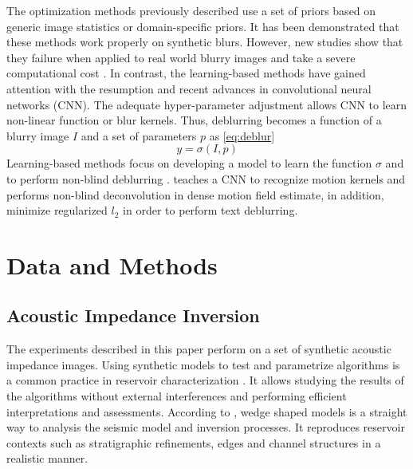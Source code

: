 \documentclass[conference]{IEEEtran}
\begin{document}
The optimization methods previously described use a set of priors based on
generic image statistics or domain-specific priors. It has been demonstrated
that these methods work properly on synthetic blurs. However, new studies show that they failure
when applied to real world blurry images \cite{Lai2016} and take a severe computational cost \cite{Chakrabarti2016}.
In contrast, the learning-based methods have gained attention with the resumption and recent advances in convolutional neural
networks (CNN). The adequate hyper-parameter adjustment allows CNN to learn
non-linear function or blur kernels. Thus, deblurring becomes a function of a blurry image $I$
and a set of parameters $p$ as \eqref{eq:deblur}
\begin{equation}
 y = \sigma(I,p)
 \label{eq:deblur}
\end{equation}
Learning-based methods focus on developing a model to learn the function $\sigma$ \cite{Hradis2015}
and to perform non-blind deblurring \cite{Chakrabarti2016}. \cite{Sun2015} teaches a CNN to
recognize motion kernels and performs non-blind deconvolution in
dense motion field estimate, in addition, \cite{Hradis2015} minimize regularized $l_2$ 
in order to perform text deblurring.

\section{Data and Methods} \label{DMsection}
\subsection{Acoustic Impedance Inversion}
The experiments described in this paper perform
on a set of synthetic acoustic impedance images. Using synthetic models
to test and parametrize algorithms is a common practice in reservoir characterization \cite{Sergio2016}. It allows studying the
results of the algorithms without external interferences and performing efficient interpretations and assessments. 
According to \cite{Harvey}, wedge shaped models is a straight way to analysis the
seismic model and inversion processes. It reproduces
reservoir contexts such as stratigraphic refinements, edges and channel structures in a realistic manner.
\end{document}
